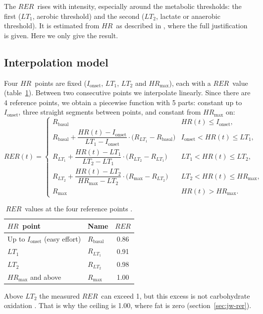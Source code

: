 \documentclass[10pt,a4paper]{article}
\newcommand{\smax}{{\scriptscriptstyle\text{max}}}
\newcommand{\RER}{\ensuremath{\mathit{RER}}}
\newcommand{\FC}{\ensuremath{\mathit{HR}}}
\newcommand{\FCmax}{\ensuremath{\mathit{HR}_{\smax}}}
\newcommand{\Ion}{\ensuremath{I_{\mathrm{onset}}}}
\begin{document}
The \RER\ rises with intensity, especially around the metabolic thresholds: the first
($LT_1$, aerobic threshold) and the second ($LT_2$, lactate or anaerobic threshold). It is
estimated from \FC\ as described in \citep{chofatfc2026}, where the full justification is
given. Here we only give the result.

\subsection{Interpolation model}
Four \FC\ points are fixed ($\Ion$, $LT_1$, $LT_2$ and $\FCmax$), each with a \RER\ value
(table~\ref{tab:ancoratges}). Between two consecutive points we interpolate linearly. Since
there are 4 reference points, we obtain a piecewise function with 5 parts: constant up to
$\Ion$, three straight segments between points, and constant from $\FCmax$ on:
\begin{equation}
\RER(t)=
\begin{cases}
R_{\mathrm{basal}} & \FC(t)\le\Ion,\\[4pt]
R_{\mathrm{basal}}+\dfrac{\FC(t)-\Ion}{LT_1-\Ion}\cdot\bigl(R_{LT_1}-R_{\mathrm{basal}}\bigr) & \Ion<\FC(t)\le LT_1,\\[10pt]
R_{LT_1}+\dfrac{\FC(t)-LT_1}{LT_2-LT_1}\cdot\bigl(R_{LT_2}-R_{LT_1}\bigr) & LT_1<\FC(t)\le LT_2,\\[10pt]
R_{LT_2}+\dfrac{\FC(t)-LT_2}{\FCmax-LT_2}\cdot\bigl(R_{\smax}-R_{LT_2}\bigr) & LT_2<\FC(t)\le\FCmax,\\[6pt]
R_{\smax} & \FC(t)>\FCmax.
\end{cases}
\label{eq:rer}
\end{equation}

\begin{table}[H]
\centering
\caption{\RER\ values at the four reference points \citep{chofatfc2026}.}
\label{tab:ancoratges}
\small
\begin{tabular}{@{}llc@{}}
\toprule
\FC\ point & Name & \RER \\
\midrule
Up to $\Ion$ (easy effort) & $R_{\mathrm{basal}}$ & 0.86 \\
$LT_1$ & $R_{LT_1}$ & 0.91 \\
$LT_2$ & $R_{LT_2}$ & 0.98 \\
$\FCmax$ and above & $R_{\smax}$ & 1.00 \\
\bottomrule
\end{tabular}
\end{table}

Above $LT_2$ the measured \RER\ can exceed 1, but this excess is not carbohydrate oxidation
\citep{chofatfc2026}. That is why the ceiling is 1.00, where fat is zero
(section~\ref{sec:jw-rer}).
\end{document}
